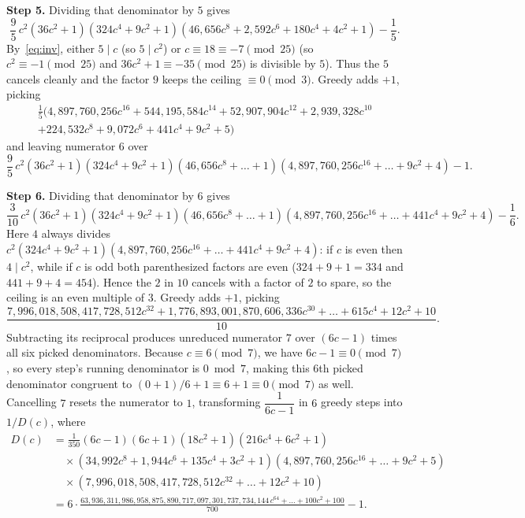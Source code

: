 \documentclass[11pt,a4paper]{amsart}
\theoremstyle{remark}
\begin{document}
\noindent\textbf{Step 5.} Dividing that denominator by $5$ gives
\[
\frac{9}{5}\,c^2(36c^2 + 1)(324c^4 + 9c^2 + 1)(46{,}656c^8 + 2{,}592c^6 + 180c^4 + 4c^2 + 1) - \frac{1}{5}.
\]
By~\eqref{eq:inv}, either $5 \mid c$ (so $5 \mid c^2$) or $c \equiv 18 \equiv -7 \pmod{25}$ (so $c^2 \equiv -1 \pmod{25}$ and $36c^2 + 1 \equiv -35 \pmod{25}$ is divisible by $5$). Thus the $5$ cancels cleanly and the factor $9$ keeps the ceiling $\equiv 0 \pmod{3}$. Greedy adds $+1$, picking
\begin{multline*}
\frac{1}{5}\bigl(4{,}897{,}760{,}256c^{16} + 544{,}195{,}584c^{14} + 52{,}907{,}904c^{12} + 2{,}939{,}328c^{10} \\
+ 224{,}532c^8 + 9{,}072c^6 + 441c^4 + 9c^2 + 5\bigr)
\end{multline*}
and leaving numerator $6$ over
\[
\frac{9}{5}\,c^2(36c^2 + 1)(324c^4 + 9c^2 + 1)(46{,}656c^8 + \dots + 1)(4{,}897{,}760{,}256c^{16} + \dots + 9c^2 + 4) - 1.
\]

\noindent\textbf{Step 6.} Dividing that denominator by $6$ gives
\[
\frac{3}{10}\,c^2(36c^2 + 1)(324c^4 + 9c^2 + 1)(46{,}656c^8 + \dots + 1)(4{,}897{,}760{,}256c^{16} + \dots + 441c^4 + 9c^2 + 4) - \frac{1}{6}.
\]
Here $4$ always divides $c^2(324c^4 + 9c^2 + 1)(4{,}897{,}760{,}256c^{16} + \dots + 441c^4 + 9c^2 + 4)$: if $c$ is even then $4 \mid c^2$, while if $c$ is odd both parenthesized factors are even ($324 + 9 + 1 = 334$ and $441 + 9 + 4 = 454$). Hence the $2$ in $10$ cancels with a factor of $2$ to spare, so the ceiling is an even multiple of $3$. Greedy adds $+1$, picking
\[
\frac{7{,}996{,}018{,}508{,}417{,}728{,}512c^{32} + 1{,}776{,}893{,}001{,}870{,}606{,}336c^{30} + \dots + 615c^4 + 12c^2 + 10}{10}.
\]
Subtracting its reciprocal produces unreduced numerator $7$ over $(6c - 1)$ times all six picked denominators. Because $c \equiv 6 \pmod{7}$, we have $6c - 1 \equiv 0 \pmod{7}$, so every step's running denominator is $0 \bmod 7$, making this $6$th picked denominator congruent to $(0 + 1)/6 + 1 \equiv 6 + 1 \equiv 0 \pmod{7}$ as well. Cancelling $7$ resets the numerator to $1$, transforming $\dfrac{1}{6c - 1}$ in $6$ greedy steps into $1 / D(c)$, where
\begin{align*}
D(c) &= \frac{1}{350}(6c - 1)(6c + 1)(18c^2 + 1)(216c^4 + 6c^2 + 1) \\
     &\quad \times (34{,}992c^8 + 1{,}944c^6 + 135c^4 + 3c^2 + 1)(4{,}897{,}760{,}256c^{16} + \dots + 9c^2 + 5) \\
     &\quad \times (7{,}996{,}018{,}508{,}417{,}728{,}512c^{32} + \dots + 12c^2 + 10) \\[4pt]
     &= 6 \cdot \frac{63{,}936{,}311{,}986{,}958{,}875{,}890{,}717{,}097{,}301{,}737{,}734{,}144\,c^{64} + \dots + 100c^2 + 100}{700} - 1.
\end{align*}
\end{document}
